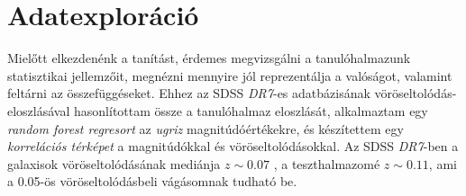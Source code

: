 \documentclass[12pt,letterpaper,oneside,openright]{book}
\begin{document}
 \section{Adatexploráció}
 Mielőtt elkezdenénk a tanítást, érdemes megvizsgálni a tanulóhalmazunk statisztikai jellemzőit, megnézni mennyire jól reprezentálja a valóságot, valamint feltárni az  összefüggéseket. Ehhez az SDSS \textit{DR7}-es adatbázisának vöröseltolódás-eloszlásával hasonlítottam össze a tanulóhalmaz eloszlását, alkalmaztam egy \textit{random forest regresort} az \textit{ugriz} magnitúdóértékekre, és készítettem egy \textit{korrelációs térképet} a magnitúdókkal és vöröseltolódásokkal. 
 \newline\indent
 Az SDSS \textit{DR7}-ben a galaxisok vöröseltolódásának mediánja $z\sim0.07$ \cite{rsd}, a teszthalmazomé $z\sim0.11$, ami a 0.05-ös vöröseltolódásbeli vágásomnak tudható be.  
\end{document}
